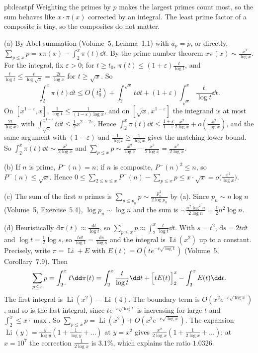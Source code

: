\begin{solution}{pb:leastpf}
\idea Weighting the primes by $p$ makes the largest primes count most, so the sum behaves like $x\cdot\pi(x)$ corrected by an integral. The least prime factor of a composite is tiny,
so the composites do not matter.

\writeup (a) By Abel summation (Volume~5, Lemma~1.1) with $a_p=p$, or directly, $\sum_{p\le x}p=x\pi(x)-\int_2^x\pi(t)\dd t$. By the prime number theorem $x\pi(x)\sim\frac{x^2}{\log x}$.
For the integral, fix $\varepsilon>0$; for $t\ge t_0$, $\pi(t)\le(1+\varepsilon)\frac t{\log t}$, and $\frac t{\log t}\le\frac t{\log\sqrt x}=\frac{2t}{\log x}$ for $t\ge\sqrt x$. So
\[
\int_2^x\pi(t)\dd t\le O(t_0^2)+\int_2^{\sqrt x}t\dd t+(1+\varepsilon)\int_{\sqrt x}^x\frac t{\log t}\dd t.
\]
On $[x^{1-\varepsilon},x]$, $\frac1{\log t}\le\frac1{(1-\varepsilon)\log x}$, and on $[\sqrt x,x^{1-\varepsilon}]$ the integrand is at most $\frac{2t}{\log x}$, with
$\int_{\sqrt x}^{x^{1-\varepsilon}}t\dd t\le\frac12x^{2-2\varepsilon}$. Hence $\int_2^x\pi(t)\dd t\le\frac{1+\varepsilon}{1-\varepsilon}\frac{x^2}{2\log x}+o(\frac{x^2}{\log x})$, and the same argument
with $(1-\varepsilon)$ and $\frac1{\log t}\ge\frac1{\log x}$ gives the matching lower bound. So $\int_2^x\pi(t)\dd t\sim\frac{x^2}{2\log x}$ and $\sum_{p\le x}p\sim\frac{x^2}{\log x}-\frac{x^2}{2\log x}=\frac{x^2}{2\log x}$.

(b) If $n$ is prime, $P^-(n)=n$; if $n$ is composite, $P^-(n)^2\le n$, so $P^-(n)\le\sqrt x$. Hence $0\le\sum_{2\le n\le x}P^-(n)-\sum_{p\le x}p\le x\cdot\sqrt x=o\bigl(\frac{x^2}{\log x}\bigr)$.

(c) The sum of the first $n$ primes is $\sum_{p\le p_n}p\sim\frac{p_n^2}{2\log p_n}$ by (a). Since $p_n\sim n\log n$ (Volume~5, Exercise~5.4), $\log p_n\sim\log n$ and the sum is
$\sim\frac{n^2\log^2n}{2\log n}=\frac12n^2\log n$.

(d) Heuristically $\mathrm d\pi(t)\approx\frac{\mathrm dt}{\log t}$, so $\sum_{p\le x}p\approx\int_2^x\frac t{\log t}\dd t$. With $s=t^2$, $\mathrm ds=2t\dd t$ and $\log t=\frac12\log s$, so
$\frac{t\dd t}{\log t}=\frac{\mathrm ds}{\log s}$ and the integral is $\operatorname{Li}(x^2)$ up to a constant. Precisely, write $\pi=\operatorname{Li}+E$ with $E(t)=O(te^{-c\sqrt{\log t}})$ (Volume~5,
Corollary~7.9). Then
\[
\sum_{p\le x}p=\int_{2^-}^xt\dd\pi(t)=\int_2^x\frac t{\log t}\dd t+\Bigl[tE(t)\Bigr]_2^x-\int_2^xE(t)\dd t.
\]
The first integral is $\operatorname{Li}(x^2)-\operatorname{Li}(4)$. The boundary term is $O(x^2e^{-c\sqrt{\log x}})$, and so is the last integral, since $te^{-c\sqrt{\log t}}$ is increasing for
large $t$ and $\int_2^x\le x\cdot\max$. So $\sum_{p\le x}p=\operatorname{Li}(x^2)+O(x^2e^{-c\sqrt{\log x}})$. The expansion $\operatorname{Li}(y)=\frac y{\log y}(1+\frac1{\log y}+\dots)$ at
$y=x^2$ gives $\frac{x^2}{2\log x}(1+\frac1{2\log x}+\dots)$; at $x=10^7$ the correction $\frac1{2\log x}$ is $3.1\%$, which explains the ratio $1.0326$.


\end{solution}
